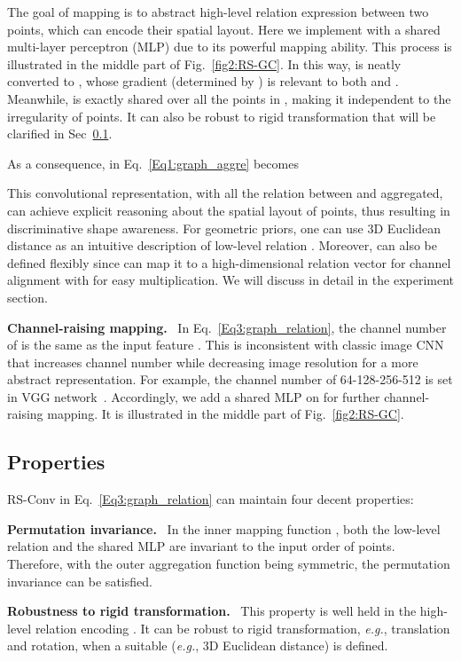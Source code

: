 \documentclass[10pt,twocolumn,letterpaper]{article}
\begin{document}
The goal of mapping  is to abstract high-level relation expression between two points, which can encode their spatial layout. Here we implement  with a shared multi-layer perceptron (MLP) due to its powerful mapping ability. This process is illustrated in the middle part of Fig.~\ref{fig2:RS-GC}. In this way,  is neatly converted to , whose gradient (determined by ) is relevant to both  and . Meanwhile,  is exactly shared over all the points in , making it independent to the irregularity of points. It can also be robust to rigid transformation that will be clarified in Sec~\ref{subsec:3.2}.

As a consequence,  in Eq.~\eqref{Eq1:graph_aggre} becomes

This convolutional representation, with all the relation between  and  aggregated, can achieve explicit reasoning about the spatial layout of points, thus resulting in discriminative shape awareness. For geometric priors, one can use 3D Euclidean distance as an intuitive description of low-level relation . Moreover,  can also be defined flexibly since  can map it to a high-dimensional relation vector for channel alignment with  for easy multiplication. We will discuss  in detail in the experiment section.

\vspace{6pt}
\noindent\textbf{Channel-raising mapping.}\,\,~In Eq.~\eqref{Eq3:graph_relation}, the channel number of  is the same as the input feature . This is inconsistent with classic image CNN that increases channel number while decreasing image resolution for a more abstract representation. For example, the channel number of 64-128-256-512 is set in VGG network~\cite{VGG}. Accordingly, we add a shared MLP on  for further channel-raising mapping. It is illustrated in the middle part of Fig.~\ref{fig2:RS-GC}.

\subsection{Properties}
\label{subsec:3.2}
RS-Conv in Eq.~\eqref{Eq3:graph_relation} can maintain four decent properties:

\vspace{6pt}
\noindent\textbf{Permutation invariance.}\,\,~In the inner mapping function , both the low-level relation  and the shared MLP  are invariant to the input order of points. Therefore, with the outer aggregation function  being symmetric, the permutation invariance can be satisfied.

\vspace{6pt}
\noindent \textbf{Robustness to rigid transformation.}\,\,~This property is well held in the high-level relation encoding . It can be robust to rigid transformation, \textit{e.g.}, translation and rotation, when a suitable  (\textit{e.g.}, 3D Euclidean distance) is defined.
\end{document}
